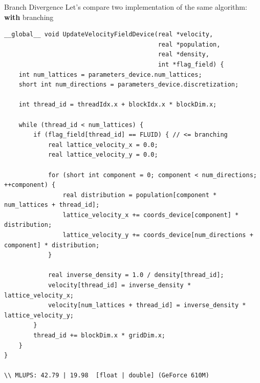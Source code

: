 \documentclass[9pt]{beamer}
\begin{document}
\begin{frame}[fragile, t]{Branch Divergence }
Let's compare two implementation of the same algorithm: \textbf{with} branching
\begin{scriptsize}
\begin{lstlisting}
__global__ void UpdateVelocityFieldDevice(real *velocity,
                                          real *population,
                                          real *density,
                                          int *flag_field) {
    int num_lattices = parameters_device.num_lattices;
    short int num_directions = parameters_device.discretization; 
    
    int thread_id = threadIdx.x + blockIdx.x * blockDim.x;
    
    while (thread_id < num_lattices) {
        if (flag_field[thread_id] == FLUID) { // <= branching
            real lattice_velocity_x = 0.0;
            real lattice_velocity_y = 0.0;
            
            for (short int component = 0; component < num_directions; ++component) {
                real distribution = population[component * num_lattices + thread_id];
                lattice_velocity_x += coords_device[component] * distribution;
                lattice_velocity_y += coords_device[num_directions + component] * distribution;
            }

            real inverse_density = 1.0 / density[thread_id];
            velocity[thread_id] = inverse_density * lattice_velocity_x;
            velocity[num_lattices + thread_id] = inverse_density * lattice_velocity_y;
        }
        thread_id += blockDim.x * gridDim.x; 
    }
}

\\ MLUPS: 42.79 | 19.98  [float | double] (GeForce 610M)
\end{lstlisting}
\end{scriptsize}
\end{frame}
\end{document}
